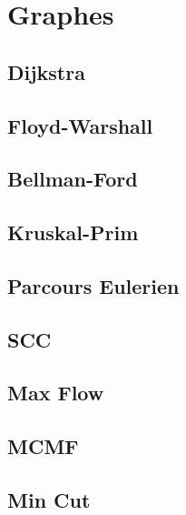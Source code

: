 \documentclass[12pt]{article}
\begin{document}
\tableofcontents\vspace{0.5cm}

\section{Graphes}
\subsection{Dijkstra}
{\scriptsize}

\subsection{Floyd-Warshall}
{\scriptsize}

\subsection{Bellman-Ford}
{\scriptsize}

\subsection{Kruskal-Prim}
{\scriptsize}

\subsection{Parcours Eulerien}
{\scriptsize}

\subsection{SCC}
{\scriptsize}

\subsection{Max Flow}
{\scriptsize}

\subsection{MCMF}
{\scriptsize}

\subsection{Min Cut}
{\scriptsize}
\end{document}
